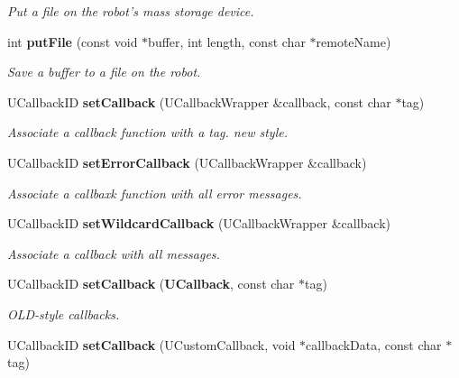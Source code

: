 \begin{CompactItemize}
\begin{CompactList}\small\item\em Put a file on the robot's mass storage device. \item\end{CompactList}\item 
int {\bf put\-File} (const void $\ast$buffer, int length, const char $\ast$remote\-Name)\label{classUAbstractClient_a16}

\begin{CompactList}\small\item\em Save a buffer to a file on the robot. \item\end{CompactList}\item 
UCallback\-ID {\bf set\-Callback} (UCallback\-Wrapper \&callback, const char $\ast$tag)\label{classUAbstractClient_a17}

\begin{CompactList}\small\item\em Associate a callback function with a tag. new style. \item\end{CompactList}\item 
UCallback\-ID {\bf set\-Error\-Callback} (UCallback\-Wrapper \&callback)\label{classUAbstractClient_a18}

\begin{CompactList}\small\item\em Associate a callbaxk function with all error messages. \item\end{CompactList}\item 
UCallback\-ID {\bf set\-Wildcard\-Callback} (UCallback\-Wrapper \&callback)\label{classUAbstractClient_a19}

\begin{CompactList}\small\item\em Associate a callback with all messages. \item\end{CompactList}\item 
UCallback\-ID {\bf set\-Callback} ({\bf UCallback}, const char $\ast$tag)\label{classUAbstractClient_a20}

\begin{CompactList}\small\item\em OLD-style callbacks. \item\end{CompactList}\item 
UCallback\-ID {\bf set\-Callback} (UCustom\-Callback, void $\ast$callback\-Data, const char $\ast$tag)\label{classUAbstractClient_a21}


\end{CompactItemize}

